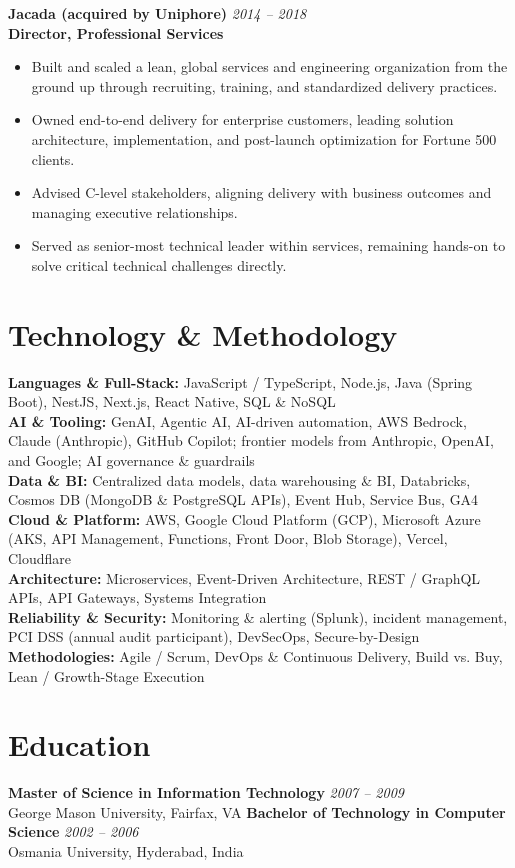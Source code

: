 \documentclass[11pt]{article}
\begin{document}
\vspace{6pt}

\textbf{Jacada (acquired by Uniphore)} \hfill \textit{2014 -- 2018} \\
\textbf{Director, Professional Services}

\begin{itemize}
  \item Built and scaled a lean, global services and engineering organization from the ground up through recruiting, training, and standardized delivery practices.
  \item Owned end-to-end delivery for enterprise customers, leading solution architecture, implementation, and post-launch optimization for Fortune 500 clients.
  \item Advised C-level stakeholders, aligning delivery with business outcomes and managing executive relationships.
  \item Served as senior-most technical leader within services, remaining hands-on to solve critical technical challenges directly.
\end{itemize}

\section*{Technology \& Methodology}
\textbf{Languages \& Full-Stack:} JavaScript / TypeScript, Node.js, Java (Spring Boot), NestJS, Next.js, React Native, SQL \& NoSQL \\
\textbf{AI \& Tooling:} GenAI, Agentic AI, AI-driven automation, AWS Bedrock, Claude (Anthropic), GitHub Copilot; frontier models from Anthropic, OpenAI, and Google; AI governance \& guardrails \\
\textbf{Data \& BI:} Centralized data models, data warehousing \& BI, Databricks, Cosmos DB (MongoDB \& PostgreSQL APIs), Event Hub, Service Bus, GA4 \\
\textbf{Cloud \& Platform:} AWS, Google Cloud Platform (GCP), Microsoft Azure (AKS, API Management, Functions, Front Door, Blob Storage), Vercel, Cloudflare \\
\textbf{Architecture:} Microservices, Event-Driven Architecture, REST / GraphQL APIs, API Gateways, Systems Integration \\
\textbf{Reliability \& Security:} Monitoring \& alerting (Splunk), incident management, PCI DSS (annual audit participant), DevSecOps, Secure-by-Design \\
\textbf{Methodologies:} Agile / Scrum, DevOps \& Continuous Delivery, Build vs. Buy, Lean / Growth-Stage Execution

\section*{Education}
\textbf{Master of Science in Information Technology} \hfill \textit{2007 -- 2009} \\
George Mason University, Fairfax, VA
\newline
\textbf{Bachelor of Technology in Computer Science} \hfill \textit{2002 -- 2006} \\
Osmania University, Hyderabad, India
\end{document}
